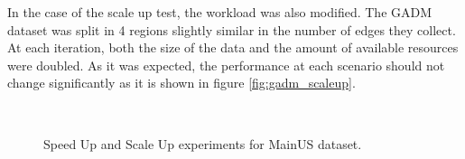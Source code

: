 In the case of the scale up test, the workload was also modified.  The GADM dataset was split in 4 regions slightly similar in the number of edges they collect.  At each iteration, both the size of the data and the amount of available resources were doubled. As it was expected, the performance at each scenario should not change significantly as it is shown in figure \ref{fig:gadm_scaleup}.

\begin{figure}[!ht]
    \centering
     \\
    \caption{Speed Up and Scale Up experiments for MainUS dataset.} \label{fig:mainus_speed_scale}
\end{figure}


